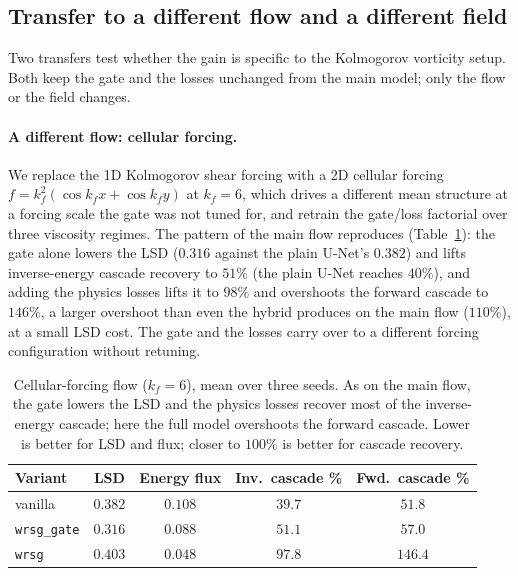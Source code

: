 \documentclass[10pt]{article} %
\begin{document}
\subsection{Transfer to a different flow and a different field}
\label{sec:scalar}

Two transfers test whether the gain is specific to the Kolmogorov vorticity setup. Both keep the gate and the losses unchanged from the main model; only the flow or the field changes.

\paragraph{A different flow: cellular forcing.} We replace the 1D Kolmogorov shear forcing with a 2D cellular forcing $f = k_f^2(\cos k_f x + \cos k_f y)$ at $k_f = 6$, which drives a different mean structure at a forcing scale the gate was not tuned for, and retrain the gate/loss factorial over three viscosity regimes. The pattern of the main flow reproduces (Table~\ref{tab:cellular}): the gate alone lowers the LSD ($0.316$ against the plain U-Net's $0.382$) and lifts inverse-energy cascade recovery to $51\%$ (the plain U-Net reaches $40\%$), and adding the physics losses lifts it to $98\%$ and overshoots the forward cascade to $146\%$, a larger overshoot than even the hybrid produces on the main flow ($110\%$), at a small LSD cost. The gate and the losses carry over to a different forcing configuration without retuning.

\begin{table}[H]
\centering
\caption{Cellular-forcing flow ($k_f=6$), mean over three seeds. As on the main flow, the gate lowers the LSD and the physics losses recover most of the inverse-energy cascade; here the full model overshoots the forward cascade. Lower is better for LSD and flux; closer to $100\%$ is better for cascade recovery.}
\label{tab:cellular}
\begin{tabular}{lcccc}
\toprule
Variant & LSD & Energy flux & Inv.\ cascade \% & Fwd.\ cascade \% \\
\midrule
vanilla            & $0.382$ & $0.108$ & $39.7$ & $51.8$ \\
\texttt{wrsg\_gate} & $\mathbf{0.316}$ & $0.088$ & $51.1$ & $57.0$ \\
\texttt{wrsg}      & $0.403$ & $\mathbf{0.048}$ & $\mathbf{97.8}$ & $146.4$ \\
\bottomrule
\end{tabular}
\end{table}
\end{document}
